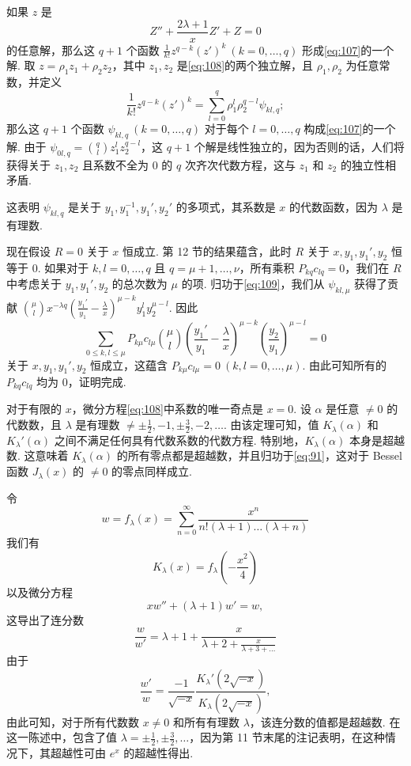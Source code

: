 如果 $z$ 是
\begin{equation}
Z'' + \frac{2\lambda+1}{x} Z' + Z = 0 \tag{108}\label{eq:108}
\end{equation}
的任意解，那么这 $q+1$ 个函数 $\frac{1}{k!} z^{q-k} (z')^k \ (k=0,\dots,q)$ 形成\eqref{eq:107}的一个解. 取 $z = \rho_1 z_1 + \rho_2 z_2$，其中 $z_1, z_2$ 是\eqref{eq:108}的两个独立解，且 $\rho_1, \rho_2$ 为任意常数，并定义
\begin{equation}
\frac{1}{k!} z^{q-k} (z')^k = \sum_{l=0}^q \rho_1^l \rho_2^{q-l} \psi_{kl,q}; \tag{109}\label{eq:109}
\end{equation}
那么这 $q+1$ 个函数 $\psi_{kl,q} \ (k=0,\dots,q)$ 对于每个 $l=0,\dots,q$ 构成\eqref{eq:107}的一个解. 由于 $\psi_{0l,q} = \binom{q}{l} z_1^l z_2^{q-l}$，这 $q+1$ 个解是线性独立的，因为否则的话，人们将获得关于 $z_1, z_2$ 且系数不全为 0 的 $q$ 次齐次代数方程，这与 $z_1$ 和 $z_2$ 的独立性相矛盾.

这表明 $\psi_{kl,q}$ 是关于 $y_1, y_1^{-1}, y_1', y_2'$ 的多项式，其系数是 $x$ 的代数函数，因为 $\lambda$ 是有理数.

现在假设 $R=0$ 关于 $x$ 恒成立. 第 12 节的结果蕴含，此时 $R$ 关于 $x, y_1, y_1', y_2$ 恒等于 0. 如果对于 $k,l=0,\dots,q$ 且 $q=\mu+1,\dots,\nu$，所有乘积 $P_{kq} c_{lq} = 0$，我们在 $R$ 中考虑关于 $y_1, y_1', y_2$ 的总次数为 $\mu$ 的项. 归功于\eqref{eq:109}，我们从 $\psi_{kl,\mu}$ 获得了贡献 $\binom{\mu}{l} x^{-\lambda q} \left(\frac{y_1'}{y_1} - \frac{\lambda}{x}\right)^{\mu-k} y_1^l y_2^{\mu-l}$. 因此
\[\sum_{0 \le k, l \le \mu} P_{k\mu} c_{l\mu} \binom{\mu}{l} \left( \frac{y_1'}{y_1} - \frac{\lambda}{x} \right)^{\mu - k} \left( \frac{y_2}{y_1} \right)^{\mu - l} = 0\]
关于 $x, y_1, y_1', y_2$ 恒成立，这蕴含 $P_{k\mu} c_{l\mu} = 0 \ (k,l=0,\dots,\mu)$. 由此可知所有的 $P_{kq} c_{lq}$ 均为 0，证明完成.

对于有限的 $x$，微分方程\eqref{eq:108}中系数的唯一奇点是 $x=0$. 设 $\alpha$ 是任意 $\neq 0$ 的代数数，且 $\lambda$ 是有理数 $\neq \pm \frac{1}{2}, -1, \pm \frac{3}{2}, -2, \dots$. 由该定理可知，值 $K_\lambda(\alpha)$ 和 $K_\lambda'(\alpha)$ 之间不满足任何具有代数系数的代数方程. 特别地，$K_\lambda(\alpha)$ 本身是超越数. 这意味着 $K_\lambda(\alpha)$ 的所有零点都是超越数，并且归功于\eqref{eq:91}，这对于 Bessel 函数 $J_\lambda(x)$ 的 $\neq 0$ 的零点同样成立.

令
\[w = f_\lambda(x) = \sum_{n=0}^\infty \frac{x^n}{n!(\lambda+1)\dots(\lambda+n)}\]
我们有
\[K_\lambda(x) = f_\lambda\left(-\frac{x^2}{4}\right)\]
以及微分方程
\[x w'' + (\lambda + 1) w' = w,\]
这导出了连分数
\[\frac{w}{w'} = \lambda + 1 + \frac{x}{\lambda + 2 + \frac{x}{\lambda + 3 + \dots}}\]
由于
\[\frac{w'}{w} = \frac{-1}{\sqrt{-x}} \frac{K_\lambda'(2\sqrt{-x})}{K_\lambda(2\sqrt{-x})},\]
由此可知，对于所有代数数 $x \neq 0$ 和所有有理数 $\lambda$，该连分数的值都是超越数. 在这一陈述中，包含了值 $\lambda = \pm \frac{1}{2}, \pm \frac{3}{2}, \dots$，因为第 11 节末尾的注记表明，在这种情况下，其超越性可由 $e^x$ 的超越性得出.

